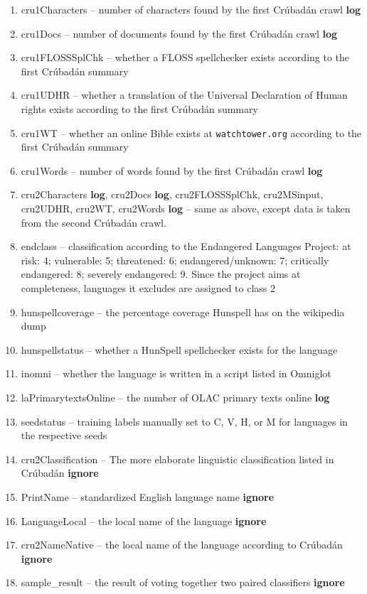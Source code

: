 \documentclass[10pt]{article}
\begin{document}
\begin{enumerate}
\item cru1Characters -- number of characters found by the first Cr\'ubad\'an
  crawl {\bf log}
\item cru1Docs -- number of documents found by the first Cr\'ubad\'an crawl
  {\bf log}
\item cru1FLOSSSplChk -- whether a FLOSS spellchecker exists according to the 
  first Cr\'ubad\'an summary
\item cru1UDHR -- whether a translation of the Universal Declaration of Human
  rights exists according to the first Cr\'ubad\'an summary
\item cru1WT -- whether an online Bible 
  exists at {\tt watchtower.org} according to the first Cr\'ubad\'an summary
\item cru1Words -- number of words found by the first Cr\'ubad\'an crawl {\bf log}
\item cru2Characters {\bf log}, cru2Docs {\bf log}, cru2FLOSSSplChk,
  cru2MSinput, cru2UDHR, cru2WT, cru2Words {\bf log} -- same as above, except
  data is taken from the second Cr\'ubad\'an crawl.
\item endclass -- classification according to the Endangered Languages
  Project: at risk: 4; vulnerable: 5; threatened: 6; endangered/unknown: 7; 
critically endangered: 8; severely endangered: 9. Since the project aims at 
completeness, languages it excludes are assigned to class 2
\item hunspellcoverage -- the percentage coverage Hunspell has on the
  wikipedia dump
\item hunspellstatus -- whether a HunSpell spellchecker exists for the language
\item inomni -- whether the language is written in a script listed in Omniglot
\item laPrimarytextsOnline -- the number of OLAC primary texts online {\bf log}
\item seedstatus -- training labels manually set to C, V, H, or M for
  languages in the respective seeds
\item cru2Classification -- The more elaborate linguistic classification
  listed in Cr\'ubad\'an {\bf ignore} 
\item PrintName -- standardized English language name {\bf ignore} 
\item LanguageLocal -- the local name of the language {\bf ignore} 
\item cru2NameNative -- the local name of the language according to
  Cr\'ubad\'an {\bf ignore} 
\item sample\_result -- the result of voting together two paired classifiers
     {\bf ignore} 

\end{enumerate}
\end{document}
